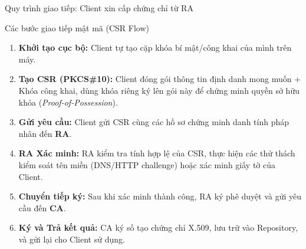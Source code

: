\documentclass[10pt, aspectratio=169]{beamer}
\begin{document}
\begin{frame}{Quy trình giao tiếp: Client xin cấp chứng chỉ từ RA}
    \begin{block}{Các bước giao tiếp mật mã (CSR Flow)}
        \begin{enumerate}
            \item \textbf{Khởi tạo cục bộ:} Client tự tạo cặp khóa bí mật/công khai của mình trên máy.
            \item \textbf{Tạo CSR (PKCS\#10):} Client đóng gói thông tin định danh mong muốn + Khóa công khai, dùng khóa riêng ký lên gói này để chứng minh quyền sở hữu khóa (\textit{Proof-of-Possession}).
            \item \textbf{Gửi yêu cầu:} Client gửi CSR cùng các hồ sơ chứng minh danh tính pháp nhân đến \textbf{RA}.
            \item \textbf{RA Xác minh:} RA kiểm tra tính hợp lệ của CSR, thực hiện các thử thách kiểm soát tên miền (DNS/HTTP challenge) hoặc xác minh giấy tờ của Client.
            \item \textbf{Chuyển tiếp ký:} Sau khi xác minh thành công, RA ký phê duyệt và gửi yêu cầu đến \textbf{CA}.
            \item \textbf{Ký và Trả kết quả:} CA ký số tạo chứng chỉ X.509, lưu trữ vào Repository, và gửi lại cho Client sử dụng.
        \end{enumerate}
    \end{block}
\end{frame}
\end{document}
